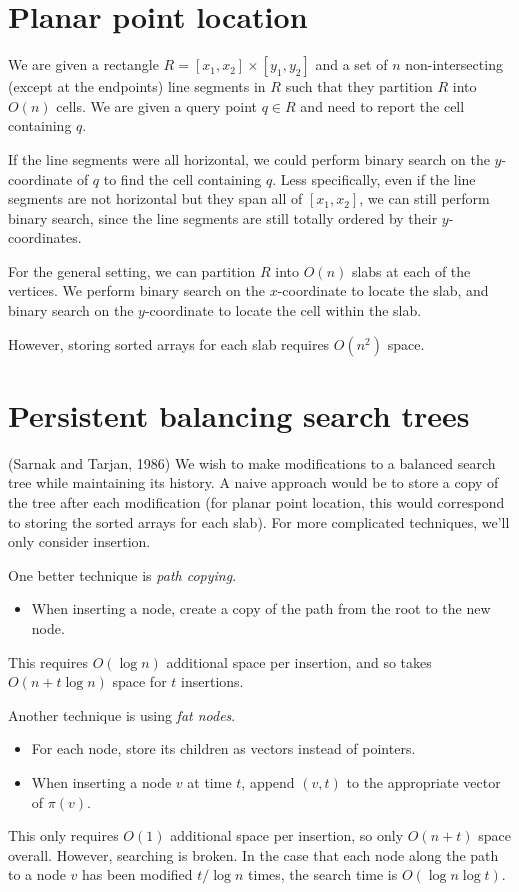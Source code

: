\section{Planar point location} \label{sec:ppl}
We are given a rectangle $R = [x_1, x_2] \times [y_1, y_2]$ and a set of
$n$ non-intersecting (except at the endpoints) line segments in $R$ such
that they partition $R$ into $O(n)$ cells.
We are given a query point $q \in R$ and need to report the cell containing
$q$.

If the line segments were all horizontal, we could perform binary search on
the $y$-coordinate of $q$ to find the cell containing $q$.
Less specifically, even if the line segments are not horizontal but they
span all of $[x_1, x_2]$, we can still perform binary search, since the line
segments are still totally ordered by their $y$-coordinates.

For the general setting, we can partition $R$ into $O(n)$ slabs at each of
the vertices.
We perform binary search on the $x$-coordinate to locate the slab, and
binary search on the $y$-coordinate to locate the cell within the slab.

However, storing sorted arrays for each slab requires $O(n^2)$ space.

\section{Persistent balancing search trees} \label{sec:pbst}
(Sarnak and Tarjan, 1986)
We wish to make modifications to a balanced search tree while maintaining
its history.
A naive approach would be to store a copy of the tree after each
modification (for planar point location, this would correspond to storing
the sorted arrays for each slab).
For more complicated techniques, we'll only consider insertion.

One better technique is \emph{path copying}.
\begin{itemize}
    \item When inserting a node, create a copy of the path from the root to
        the new node.
\end{itemize}
This requires $O(\log n)$ additional space per insertion, and so takes
$O(n + t \log n)$ space for $t$ insertions.

Another technique is using \emph{fat nodes}.
\begin{itemize}
    \item For each node, store its children as vectors instead of pointers.
    \item When inserting a node $v$ at time $t$, append $(v, t)$ to the
        appropriate vector of $\pi(v)$.
\end{itemize}
This only requires $O(1)$ additional space per insertion, so only
$O(n + t)$ space overall.
However, searching is broken.
In the case that each node along the path to a node $v$ has been modified
$t / \log n$ times, the search time is $O(\log n \log t)$.

